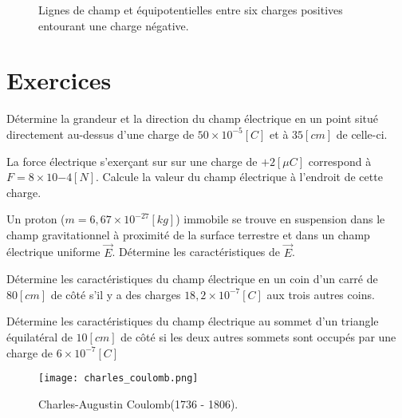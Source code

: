 \begin{figure}[!ht]
    \centering
    \resizebox{.7\linewidth}{!}{}
    \caption{Lignes de champ et équipotentielles entre six charges positives entourant une charge négative.}
    \label{six_charges}
\end{figure}

\newpage

\section{Exercices}
\begin{exercise}
    Détermine la grandeur et la direction du champ électrique en un point situé directement au-dessus d'une charge de \(50 \times 10^{-5}[C]\) et à \(35[cm]\) de celle-ci.
\end{exercise}

\begin{exercise}
    La force électrique s'exerçant sur sur une charge de \(+2 [\mu C]\) correspond à \(F=8 \times 10{-4}[N]\). Calcule la valeur du champ électrique à l'endroit de cette charge.
\end{exercise}

\begin{exercise}
    Un proton (\(m=6,67 \times 10^{-27}[kg]\)) immobile se trouve en suspension dans le champ gravitationnel à proximité de la surface terrestre et dans un champ électrique uniforme \(\vec{E}\). Détermine les caractéristiques de \(\vec{E}\).
\end{exercise}

\begin{exercise}
    Détermine les caractéristiques du champ électrique en un coin d'un carré de \(80[cm]\) de côté s'il y a des charges \(18,2 \times 10^{-7}[C]\) aux trois autres coins.
\end{exercise}

\begin{exercise}
    Détermine les caractéristiques du champ électrique au sommet d'un triangle équilatéral de \(10[cm]\) de côté si les deux autres sommets sont occupés par une charge de \(6 \times 10^{-7}[C]\)
\end{exercise}

\begin{figure}[h!]
    \centering
    \texttt{[image: charles\_coulomb.png]}
    \caption{Charles-Augustin Coulomb(1736 - 1806).}
    \label{charles_coulomb}
\end{figure}
